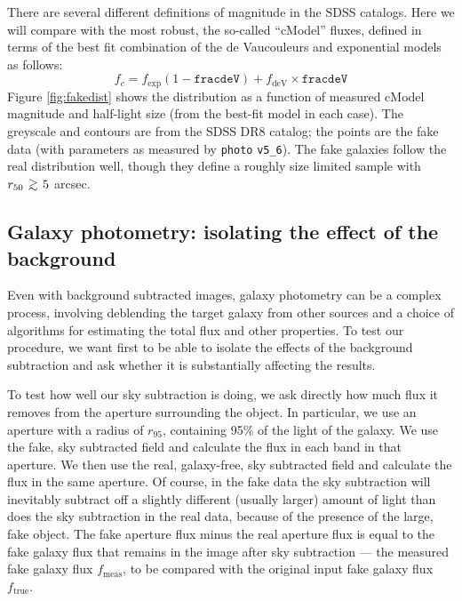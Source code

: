 \documentclass[10pt,preprint]{aastex}
\def\simgreat{\mathbin{\lower 3pt\hbox
    {$\,\rlap{\raise 5pt\hbox{$\char'076$}}\mathchar"7218\,$}}} %
\begin{document}
There are several different definitions of magnitude in the SDSS
catalogs. Here we will compare with the most robust, the so-called
``cModel'' fluxes, defined in terms of the best fit combination of the
de Vaucouleurs and exponential models as follows:
\begin{equation}
 f_c = f_{\mathrm{exp}} \left(1-\mathtt{fracdeV}\right) +
 f_{\mathrm{deV}}
 \times \mathtt{fracdeV}
\end{equation}
Figure \ref{fig:fakedist} shows the distribution as a function of
measured cModel magnitude and half-light size (from the best-fit model
in each case). The greyscale and contours are from the SDSS DR8
catalog; the points are the fake data (with parameters as measured by
{\tt photo} {\tt v5\_6}). The fake galaxies follow the real
distribution well, though they define a roughly size limited sample
with $r_{50} \simgreat 5$ arcsec.

\subsection{Galaxy photometry: isolating the effect of the background}
\label{sec:simplegal}

Even with background subtracted images, galaxy photometry can be a
complex process, involving deblending the target galaxy from other
sources and a choice of algorithms for estimating the total flux and
other properties.  To test our procedure, we want first to be able to
isolate the effects of the background subtraction and ask whether it
is substantially affecting the results.

To test how well our sky subtraction is doing, we ask directly how
much flux it removes from the aperture surrounding the object. In
particular, we use an aperture with a radius of $r_{95}$, containing
95\% of the light of the galaxy.  We use the fake, sky subtracted
field and calculate the flux in each band in that aperture.  We then
use the real, galaxy-free, sky subtracted field and calculate the flux
in the same aperture.  Of course, in the fake data the sky subtraction
will inevitably subtract off a slightly different (usually larger)
amount of light than does the sky subtraction in the real data,
because of the presence of the large, fake object. The fake aperture
flux minus the real aperture flux is equal to the fake galaxy flux
that remains in the image after sky subtraction --- the measured fake
galaxy flux $f_{\mathrm{meas}}$, to be compared with the original
input fake galaxy flux $f_{\mathrm{true}}$.
\end{document}
